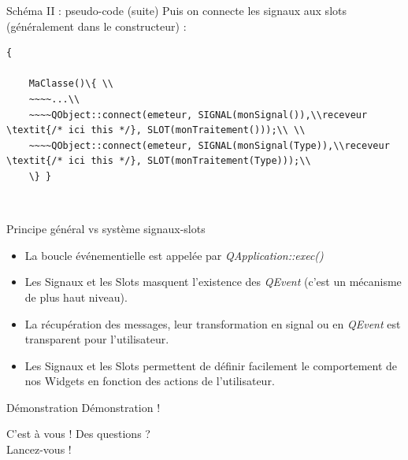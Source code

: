 \documentclass[12pt]{beamer}
\begin{document}
    \begin{frame}{Schéma II : pseudo-code (suite)}
    Puis on connecte les signaux aux slots (généralement dans le constructeur) :

   \begin{verbatim}{

    MaClasse()\{ \\ 
    ~~~~...\\
    ~~~~QObject::connect(emeteur, SIGNAL(monSignal()),\\receveur \textit{/* ici this */}, SLOT(monTraitement()));\\ \\
    ~~~~QObject::connect(emeteur, SIGNAL(monSignal(Type)),\\receveur \textit{/* ici this */}, SLOT(monTraitement(Type)));\\
    \} }
    \end{verbatim}
    \\
    \end{frame}
    \begin{frame}{Principe général vs système signaux-slots}
    \begin{itemize}
    \item{La boucle événementielle est appelée par \textit{QApplication::exec()}}
    \item{Les Signaux et les Slots masquent l'existence des \textit{QEvent} (c'est un mécanisme de plus haut niveau).}
    \item{La récupération des messages, leur transformation en signal ou en \textit{QEvent} est transparent pour l'utilisateur.}
    \item{Les Signaux et les Slots permettent de définir facilement le comportement de nos Widgets en fonction des actions de l'utilisateur.}
    \end{itemize}
    \end{frame}
    
    
    
\begin{frame}{Démonstration}
Démonstration !
\end{frame}
    
\begin{frame}{C'est à vous !}
Des questions ?\\
Lancez-vous !
  \end{frame}
\end{document}
